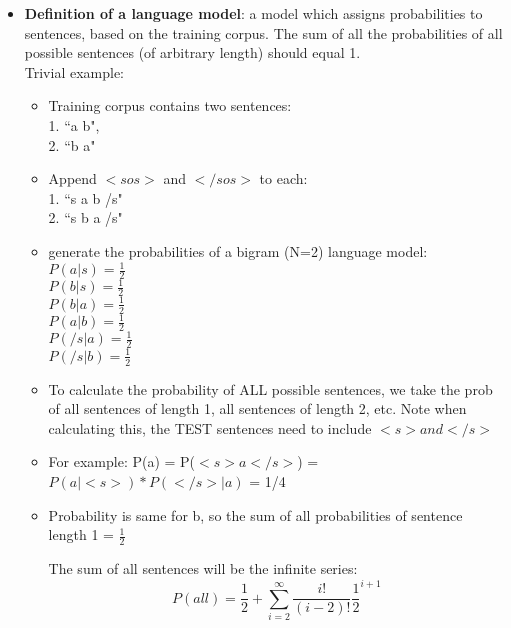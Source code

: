 \documentclass[a4paper]{article}
\begin{document}
\begin{itemize}
		\item \textbf{Definition of a language model}: a model which assigns probabilities to sentences, based on the training corpus. The sum of all the probabilities of all possible sentences (of arbitrary length) should equal 1. \\ 
			
			Trivial example:
			\begin{itemize}
				\item Training corpus contains two sentences: \\ 
				1. ``a b", \\ 
				2. ``b a"
				
				\item Append $<sos>$ and $</sos>$ to each: \\
				1. ``s a b /s" 
				\\ 2. ``s b a /s"
				
				\item generate the probabilities of a bigram (N=2) language model: \\
				
				$P(a | s) = \frac{1}{2}$ \\
				$P(b | s) = \frac{1}{2}$ \\
				$P(b | a) = \frac{1}{2}$ \\
				$P(a | b) = \frac{1}{2}$ \\
				$P(/s | a) = \frac{1}{2}$ \\
				$P(/s | b) = \frac{1}{2}$ \\
				
				\item To calculate the probability of ALL possible sentences, we take the prob of all sentences of length 1, all sentences of length 2, etc. Note when calculating this, the TEST sentences need to include $<s> and </s>$
				
				\item For example: P(a) = P($<s> a </s>$) = $P(a | <s>) * P(</s> | a)$ = 1/4
				
				\item Probability is same for b, so the sum of all probabilities of sentence length 1 = $\frac{1}{2}$
				
				The sum of all sentences will be the infinite series: \\
				
				$$P(all) = \frac{1}{2} + \sum_{i=2}^{\infty} \frac{i!}{(i-2)!} \frac{1}{2} ^ {i + 1}$$ \\
				

\end{itemize}
\end{itemize}
\end{document}
